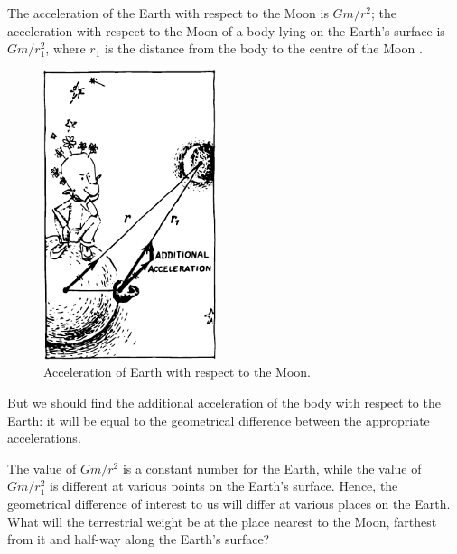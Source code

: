 The acceleration of the Earth with respect to the Moon
is $Gm/r^{2}$; the acceleration with respect to the Moon of
a body lying on the Earth's surface is $Gm/r_{1}^{2}$, where $r_{1}
$ is the distance from the body to the centre of the Moon
.

\begin{figure}[!ht]
\centering
\includegraphics[width=0.45\textwidth]{figures/fig-6-10.pdf}
\caption{Acceleration of Earth with respect to the Moon.}
\label{fig-6-10}
\end{figure}

But we should find the additional acceleration of the
body with respect to the Earth: it will be equal to the
geometrical difference between the appropriate accelerations.

The value of  $Gm/r^{2}$ is a constant number for the Earth, while the value of  $Gm/r_{1}^{2}$ is different at various points on
the Earth's surface. Hence, the geometrical difference of interest to us will differ at various places on the Earth.
What will the terrestrial weight be at the place nearest
to the Moon, farthest from it and half-way along the
Earth's surface?



